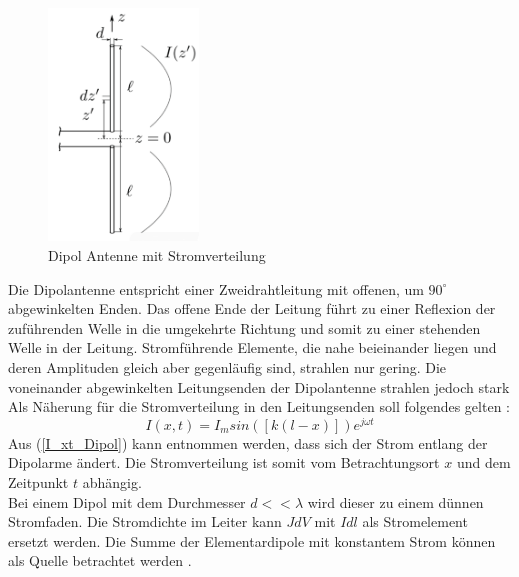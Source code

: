 \begin{figure}[!ht]
	\centering
	\includegraphics[width=4cm]{content/bilder/Dipol_EMANT_S42.pdf}%
	\caption{Dipol Antenne mit Stromverteilung \cite{Tekom}}
	\label{FitzDipol}
\end{figure}
Die Dipolantenne entspricht einer Zweidrahtleitung mit offenen, um $90^\circ$ abgewinkelten Enden. Das offene Ende der Leitung führt zu einer Reflexion der zuführenden Welle in die umgekehrte Richtung und somit zu einer stehenden Welle in der Leitung. Stromführende Elemente, die nahe beieinander liegen und deren Amplituden gleich aber gegenläufig sind, strahlen nur gering. Die voneinander abgewinkelten Leitungsenden der Dipolantenne strahlen jedoch stark
Als Näherung für die Stromverteilung in den Leitungsenden soll folgendes gelten \cite{elliott1981antenna}:
\begin{equation}\label{I_xt_Dipol} 
I(x,t) =I_{m}sin([k(l-x)])e^{j\omega t}
\end{equation}
Aus  (\ref{I_xt_Dipol}) kann entnommen werden, dass sich der Strom entlang der Dipolarme ändert. Die Stromverteilung ist somit vom Betrachtungsort $x$ und dem Zeitpunkt $t$ abhängig.\\
Bei einem Dipol mit dem Durchmesser $d<<\lambda$ wird dieser zu einem dünnen Stromfaden. Die Stromdichte im Leiter kann $J \textit{d}V$ mit $I\textit{d}l$ als Stromelement ersetzt werden. Die Summe der Elementardipole mit konstantem Strom können als Quelle betrachtet werden \cite{elliott1981antenna}.\\

